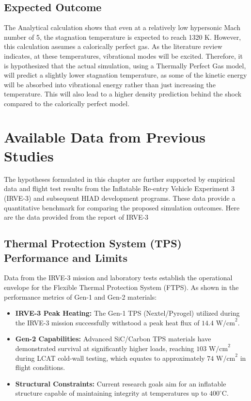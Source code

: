 \subsection{Expected Outcome}
The Analytical calculation shows that even at a relatively low hypersonic Mach number of 5, the stagnation temperature is expected to reach 1320 K. However, this calculation assumes a calorically perfect gas. As the literature review indicates, at these temperatures, vibrational modes will be excited. Therefore, it is hypothesized that the actual simulation, using a Thermally Perfect Gas model, will predict a slightly lower stagnation temperature, as some of the kinetic energy will be absorbed into vibrational energy rather than just increasing the temperature. This will also lead to a higher density prediction behind the shock compared to the calorically perfect model.

\section{Available Data from Previous Studies}

The hypotheses formulated in this chapter are further supported by empirical data and flight test results from the Inflatable Re-entry Vehicle Experiment 3 (IRVE-3) and subsequent HIAD development programs. These data provide a quantitative benchmark for comparing the proposed simulation outcomes. Here are the data provided from the report of IRVE-3\cite{dillman2015irve3}

\subsection{Thermal Protection System (TPS) Performance and Limits}
Data from the IRVE-3 mission and laboratory tests establish the operational envelope for the Flexible Thermal Protection System (FTPS). As shown in the performance metrics of Gen-1 and Gen-2 materials:
\begin{itemize}
    \item \textbf{IRVE-3 Peak Heating:} The Gen-1 TPS (Nextel/Pyrogel) utilized during the IRVE-3 mission successfully withstood a peak heat flux of $14.4 \text{ W/cm}^2$.
    \item \textbf{Gen-2 Capabilities:} Advanced SiC/Carbon TPS materials have demonstrated survival at significantly higher loads, reaching $103 \text{ W/cm}^2$ during LCAT cold-wall testing, which equates to approximately $74 \text{ W/cm}^2$ in flight conditions.
    \item \textbf{Structural Constraints:} Current research goals aim for an inflatable structure capable of maintaining integrity at temperatures up to $400^\circ\text{C}$.
\end{itemize}

